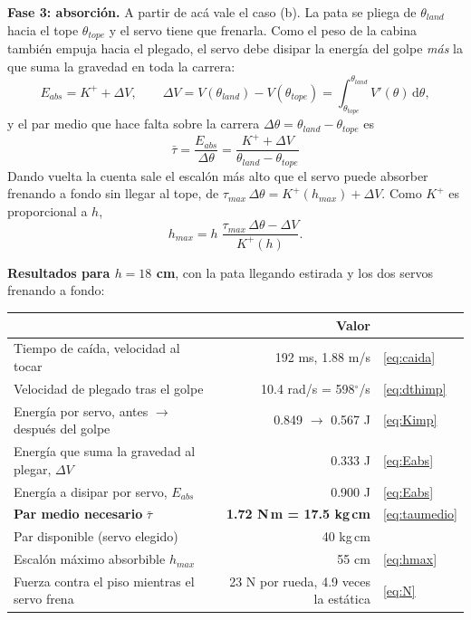 \documentclass[11pt,a4paper]{article}
\newcommand{\dd}{\mathrm{d}}
\begin{document}
\textbf{Fase 3: absorción.} A partir de acá vale el caso (b). La pata se pliega de \(\theta_{land}\) hacia el
tope \(\theta_{tope}\) y el servo tiene que frenarla. Como el peso de la cabina también empuja hacia el
plegado, el servo debe disipar la energía del golpe \emph{más} la que suma la gravedad en toda la carrera:
\begin{equation}
E_{abs}=K^{+}+\Delta V,\qquad
\Delta V=V(\theta_{land})-V(\theta_{tope})=\int_{\theta_{tope}}^{\theta_{land}}V'(\theta)\,\dd\theta,
\label{eq:Eabs}
\end{equation}
y el par medio que hace falta sobre la carrera \(\Delta\theta=\theta_{land}-\theta_{tope}\) es
\begin{equation}
\boxed{\;\bar\tau=\frac{E_{abs}}{\Delta\theta}=\frac{K^{+}+\Delta V}{\theta_{land}-\theta_{tope}}\;}
\label{eq:taumedio}
\end{equation}
Dando vuelta la cuenta sale el escalón más alto que el servo puede absorber frenando a fondo sin llegar al
tope, de \(\tau_{max}\,\Delta\theta=K^{+}(h_{max})+\Delta V\). Como \(K^{+}\) es proporcional a \(h\),
\begin{equation}
h_{max}=h\;\frac{\tau_{max}\,\Delta\theta-\Delta V}{K^{+}(h)} .
\label{eq:hmax}
\end{equation}

\textbf{Resultados para \(h=18\) cm}, con la pata llegando estirada y los dos servos frenando a fondo:

\begin{center}\small
\begin{tabular}{lrl}
\toprule
 & Valor & \\
\midrule
Tiempo de caída, velocidad al tocar & 192 ms, 1.88 m/s & \eqref{eq:caida} \\
Velocidad de plegado tras el golpe & 10.4 rad/s = 598\(^\circ\)/s & \eqref{eq:dthimp} \\
Energía por servo, antes \(\to\) después del golpe & 0.849 \(\to\) 0.567 J & \eqref{eq:Kimp} \\
Energía que suma la gravedad al plegar, \(\Delta V\) & 0.333 J & \eqref{eq:Eabs} \\
Energía a disipar por servo, \(E_{abs}\) & 0.900 J & \eqref{eq:Eabs} \\
\textbf{Par medio necesario} \(\bar\tau\) & \textbf{1.72 N\,m = 17.5 kg\,cm} & \eqref{eq:taumedio} \\
Par disponible (servo elegido) & 40 kg\,cm & \\
Escalón máximo absorbible \(h_{max}\) & 55 cm & \eqref{eq:hmax} \\
Fuerza contra el piso mientras el servo frena & 23 N por rueda, 4.9 veces la estática & \eqref{eq:N} \\
\bottomrule
\end{tabular}
\end{center}
\end{document}
